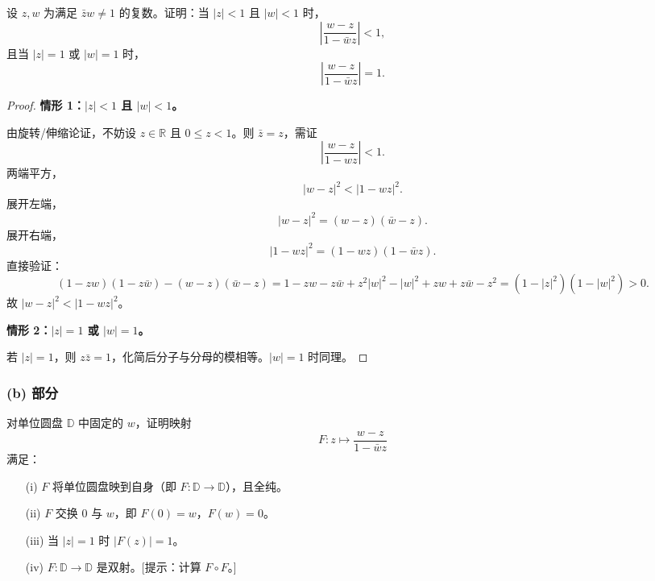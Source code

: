 \documentclass[11pt,a4paper]{article}
\newcommand{\R}{\mathbb{R}}
\theoremstyle{definition}
\begin{document}
设 $z, w$ 为满足 $\bar z w \ne 1$ 的复数。证明：当 $|z| < 1$ 且 $|w| < 1$ 时，
\[
  \left|\frac{w - z}{1 - \bar wz}\right| < 1,
\]
且当 $|z| = 1$ 或 $|w| = 1$ 时，
\[
  \left|\frac{w - z}{1 - \bar wz}\right| = 1.
\]

\begin{proof}
\textbf{情形 1：$|z| < 1$ 且 $|w| < 1$。}

由旋转/伸缩论证，不妨设 $z \in \R$ 且 $0 \le z < 1$。则 $\bar z = z$，需证
\[
  \left|\frac{w - z}{1 - wz}\right| < 1.
\]
两端平方，
\[
  |w - z|^2 < |1 - wz|^2.
\]
展开左端，
\[
  |w - z|^2 = (w-z)(\bar w - z).
\]
展开右端，
\[
  |1 - wz|^2 = (1 - wz)(1 - \bar wz).
\]
直接验证：
\[
  (1 - zw)(1 - z\bar w) - (w-z)(\bar w - z)
  = 1 - zw - z\bar w + z^2|w|^2 - |w|^2 + zw + z\bar w - z^2
  = (1-|z|^2)(1-|w|^2) > 0.
\]
故 $|w - z|^2 < |1 - wz|^2$。

\textbf{情形 2：$|z| = 1$ 或 $|w| = 1$。}

若 $|z| = 1$，则 $z\bar z = 1$，化简后分子与分母的模相等。$|w|=1$ 时同理。
\end{proof}

\subsubsection*{(b) 部分}

对单位圆盘 $\mathbb{D}$ 中固定的 $w$，证明映射
\[
  F : z \mapsto \frac{w - z}{1 - \bar wz}
\]
满足：

\begin{enumerate}
  \item[(i)] $F$ 将单位圆盘映到自身（即 $F : \mathbb{D} \to \mathbb{D}$），且全纯。
  \item[(ii)] $F$ 交换 $0$ 与 $w$，即 $F(0) = w$，$F(w) = 0$。
  \item[(iii)] 当 $|z| = 1$ 时 $|F(z)| = 1$。
  \item[(iv)] $F : \mathbb{D} \to \mathbb{D}$ 是双射。[提示：计算 $F \circ F$。]
\end{enumerate}
\end{document}
